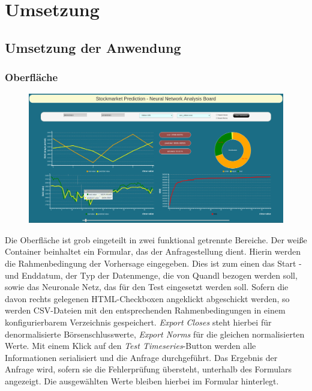 \chapter{Umsetzung}
\label{chapter:Umsetzung}

\section{Umsetzung der Anwendung}
\label{section:Umsetzung der Anwendung}

\subsection{Oberfläche}
\label{subsection:Oberfläche}

\begin{figure}[H]
\centering
\includegraphics[width=15cm]{Bilder/Umsetzung/Mokup_GUI.png}
\end{figure}
Die Oberfläche ist grob eingeteilt in zwei funktional getrennte Bereiche. Der weiße Container beinhaltet ein Formular, das der Anfragestellung dient. Hierin werden die Rahmenbedingung der Vorhersage eingegeben. Dies ist zum einen das Start - und Enddatum, der Typ der Datenmenge, die von Quandl bezogen werden soll, sowie das Neuronale Netz, das für den Test eingesetzt werden soll. Sofern die davon rechts gelegenen HTML-Checkboxen angeklickt abgeschickt werden, so werden CSV-Dateien mit den entsprechenden Rahmenbedingungen in einem konfigurierbarem Verzeichnis gespeichert. \emph{Export Closes} steht hierbei für denormalisierte Börsenschlusswerte, \emph{Export Norms} für die gleichen normalisierten Werte. Mit einem Klick auf den \emph{Test Timeseries}-Button werden alle Informationen serialisiert und die Anfrage durchgeführt.
Das Ergebnis der Anfrage wird, sofern sie die Fehlerprüfung übersteht, unterhalb des Formulars angezeigt. Die ausgewählten Werte bleiben hierbei im Formular hinterlegt.
